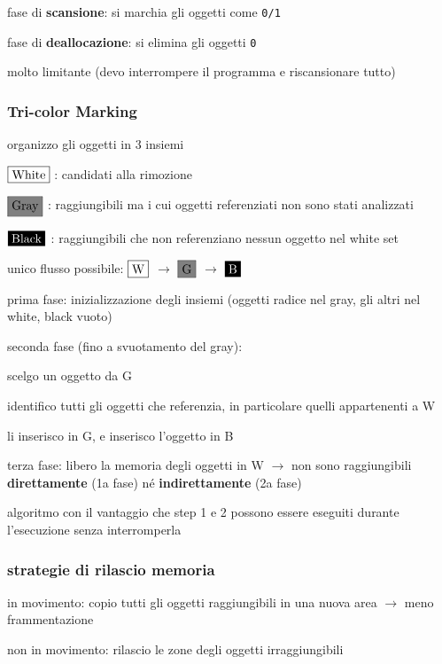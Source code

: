 fase di \textbf{scansione}: si marchia gli oggetti come \texttt{0/1}

fase di \textbf{deallocazione}: si elimina gli oggetti \texttt{0}

molto limitante (devo interrompere il programma e riscansionare tutto)

\subsubsection{Tri-color Marking}

organizzo gli oggetti in 3 insiemi

$\color{black}\fcolorbox{black}{white}{White}$ : candidati alla rimozione

$\color{black}\fcolorbox{black}{gray}{Gray}$ : raggiungibili ma i cui oggetti referenziati non sono stati analizzati

$\color{white}\fcolorbox{white}{black}{Black}$ : raggiungibili che non referenziano nessun oggetto nel white set

unico flusso possibile: $\color{black}\fcolorbox{black}{white}{W}$ $\rightarrow$ $\color{black}\fcolorbox{black}{gray}{G}$ $\rightarrow$ $\color{white}\fcolorbox{white}{black}{B}$

prima fase: inizializzazione degli insiemi (oggetti radice nel gray, gli altri nel white, black vuoto)

seconda fase (fino a svuotamento del gray):

scelgo un oggetto da G

identifico tutti gli oggetti che referenzia, in particolare quelli appartenenti a W

li inserisco in G, e inserisco l'oggetto in B

terza fase: libero la memoria degli oggetti in W $\rightarrow$ non sono raggiungibili \textbf{direttamente} (1a fase) n\'e \textbf{indirettamente} (2a fase)

algoritmo con il vantaggio che step 1 e 2 possono essere eseguiti durante l'esecuzione senza interromperla

\subsubsection{strategie di rilascio memoria}

in movimento: copio tutti gli oggetti raggiungibili in una nuova area $\rightarrow$ meno frammentazione

non in movimento: rilascio le zone degli oggetti irraggiungibili

